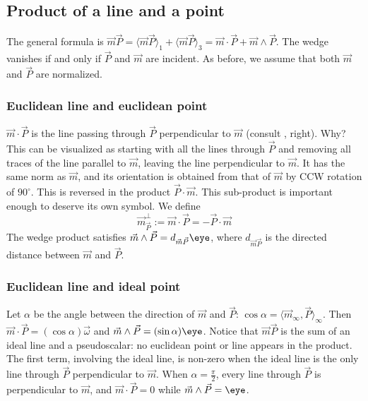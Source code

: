 \documentclass{birkjour}
\begin{document}
\subsection{Product of a line and a point}
\label{sec:prlnpt}
The general formula is $\vec{m} \vec{P} =  \langle \vec{m}\vec{P}\rangle_{1} +\langle \vec{m}\vec{P}\rangle_{3} = \vec{m} \cdot \vec{P} + \vec{m} \wedge \vec{P}$.  The wedge vanishes if and only if $\vec{P}$ and $\vec{m}$ are incident.  As before, we assume that both $\vec{m}$ and $\vec{P}$ are normalized.

\subsubsection{Euclidean line and euclidean point}   $ \vec{m} \cdot \vec{P} $ is the line passing through $\vec{P}$ perpendicular to $\vec{m}$ (consult , right). Why? This can be visualized as starting with all the lines through $\vec{P}$ and removing all traces of the line parallel to $\vec{m}$, leaving the line perpendicular to $\vec{m}$.  %
It has the same norm as $\vec{m}$, and its orientation is obtained from that of $\vec{m}$ by CCW rotation of $90^{\circ}$.  This is reversed in the product $\vec{P} \cdot \vec{m}$.  This sub-product is important enough to deserve its own symbol.  We define \[\vec{m}^{\perp}_{\vec{P}} := \vec{m} \cdot \vec{P} = - \vec{P} \cdot \vec{m}\]  The wedge product satisfies $\vec{m}\wedge \vec{P} = d_{\vec{m}\vec{P}}\eye$, where $d_{\vec{m}\vec{P}}$ is the directed distance between $\vec{m}$ and $\vec{P}$.   %

\subsubsection{Euclidean line and ideal point}  Let $\alpha$ be the angle between the direction of $\vec{m}$ and $\vec{P}$: $\cos{\alpha} = \langle \vec{m}_{\infty}, \vec{P} \rangle_{\infty}$. Then $ \vec{m} \cdot \vec{P} = (\cos{\alpha})\vec{\omega}$ and $\vec{m}\wedge \vec{P} = (\sin{\alpha}) \eye$.  
Notice that $\vec{m} \vec{P}$ is the sum of an  ideal line and a pseudoscalar: no euclidean point or line appears in the product. The first term, involving the ideal line, is non-zero when the ideal line is the only line through $\vec{P}$ perpendicular to $\vec{m}$.  When $\alpha = \frac{\pi}{2}$, every line through $\vec{P}$ is   perpendicular to $\vec{m}$, and $\vec{m} \cdot \vec{P} = 0$ while $\vec{m}\wedge \vec{P}  = \eye$.  
\end{document}
